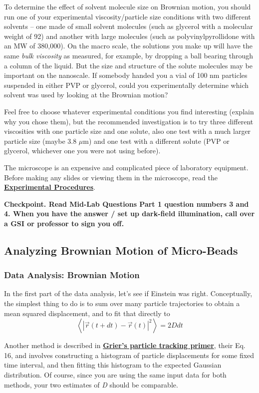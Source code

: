 \documentclass{../lab}
\begin{document}
To determine the effect of solvent molecule size on Brownian motion, you should run one of your experimental viscosity/particle size conditions with two different solvents -- one made of small solvent molecules (such as glycerol with a molecular weight of 92) and another with large molecules (such as polyvinylpyrollidone with an MW of 380,000). On the macro scale, the solutions you make up will have the same \emph{bulk viscosity} as measured, for example, by dropping a ball bearing through a column of the liquid. But the size and structure of the solute molecules may be important on the nanoscale. If somebody handed you a vial of 100 nm particles suspended in either PVP or glycerol, could you experimentally determine which solvent was used by looking at the Brownian motion?

Feel free to choose whatever experimental conditions you find interesting (explain why you chose them), but the recommended investigation is to try three different viscosities with one particle size and one solute, also one test with a much larger particle size (maybe 3.8 $\mu$m) and one test with a different solute (PVP or glycerol, whichever one you were not using before).

The microscope is an expensive and complicated piece of laboratory equipment. Before making any slides or viewing them in the microscope, read the \href{http://experimentationlab.berkeley.edu/node/84}{\textbf{Experimental Procedures}}.

\textbf{Checkpoint. Read Mid-Lab Questions Part 1 question numbers 3 and 4. When you have the answer / set up dark-field illumination, call over a GSI or professor to sign you off.}

\subsection{Analyzing Brownian Motion of Micro-Beads}

\subsubsection{Data Analysis: Brownian Motion}

In the first part of the data analysis, let's see if Einstein was right. Conceptually, the simplest thing to do is to sum over many particle trajectories to obtain a mean squared displacement, and to fit that directly to
\[
\left\langle {\left| \vec r(t+dt)-\vec r(t) \right|}^2 \right\rangle = 2 D dt
\]

Another method is described in \href{http://www.physics.nyu.edu/grierlab/methods/node11.html#eqes}{\textbf{Grier's particle tracking primer}}, their Eq. 16, and involves constructing a histogram of particle displacements for some fixed time interval, and then fitting this histogram to the expected Gaussian distribution. Of course, since you are using the same input data for both methods, your two estimates of \emph{D} should be comparable.
\end{document}
